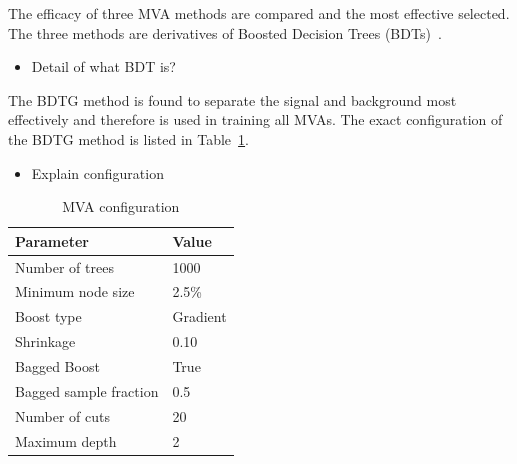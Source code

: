 The efficacy of three MVA methods are compared and the most effective selected. The three methods are derivatives of Boosted Decision Trees (BDTs)~\cite{Breiman}.

{\color{Red}
\begin{itemize}
\item Detail of what BDT is?
\end{itemize}
}


The BDTG method is found to separate the signal and background most effectively and therefore is used in training all MVAs.
The exact configuration of the BDTG method is listed in Table~\ref{tab:mvaconfiguration}. 

{\color{Red}
\begin{itemize}
\item Explain configuration
\end{itemize}
}
\begin{table}[h]
\begin{center}
\begin{tabular}{ l l }
\hline
Parameter & Value \\
\hline
Number of trees         & 1000      \\
Minimum node size       & 2.5\%     \\
Boost type              & Gradient  \\ 
Shrinkage               & 0.10      \\ 
Bagged Boost            & True      \\ 
Bagged sample fraction  & 0.5       \\  
Number of cuts          & 20        \\  
Maximum depth           & 2         \\  
\hline
\end{tabular}
\end{center}
\caption{MVA configuration}
\label{tab:mvaconfiguration}
\end{table}  

